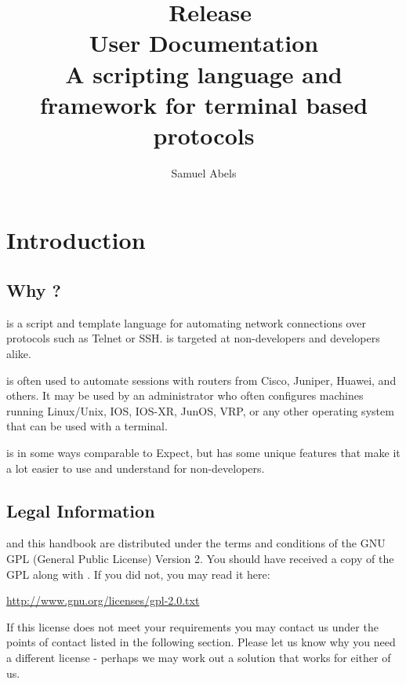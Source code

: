\title{\productname\ Release \productversion\\
User Documentation\\
\vspace{5 mm}
\large A scripting language and framework for terminal based protocols}
\author{Samuel Abels}


\maketitle
\tableofcontents

\newpage
\section{Introduction}
\subsection{Why \productname?}

\product is a script and template language for automating network connections 
over protocols such as Telnet or SSH. \product is targeted at non-developers 
and developers alike.

\product is often used to automate sessions with routers from Cisco, Juniper, 
Huawei, and others. It may be used by an administrator who often configures 
machines running Linux/Unix, IOS, IOS-XR, JunOS, VRP, or any other operating 
system that can be used with a terminal.

\product is in some ways comparable to Expect, but has some unique features 
that make it a lot easier to use and understand for non-developers. 


\subsection{Legal Information}

\product and this handbook are distributed under the terms and conditions 
of the GNU GPL (General Public License) Version 2. You should have received 
a copy of the GPL along with \product. If you did not, you may read it here:

\vspace{1em}
\url{http://www.gnu.org/licenses/gpl-2.0.txt}
\vspace{1em}

If this license does not meet your requirements you may contact us under 
the points of contact listed in the following section. Please let us know 
why you need a different license - perhaps we may work out a solution 
that works for either of us.



